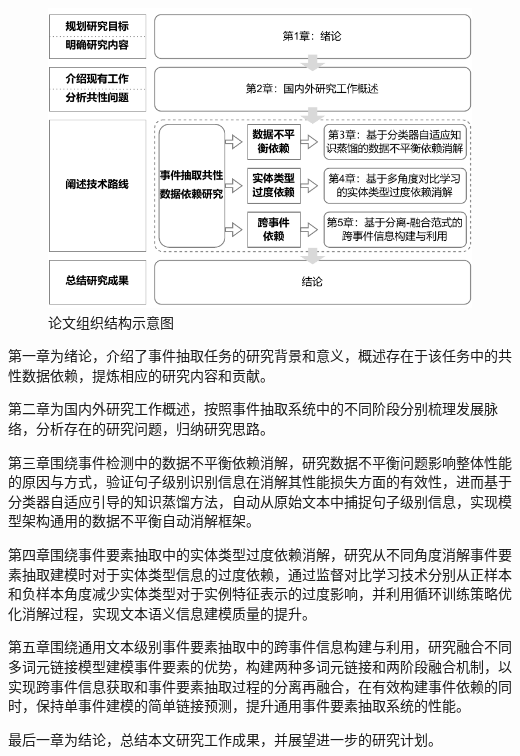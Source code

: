 \begin{figure}[]
    \centering
   \includegraphics[width=1\linewidth]{figures/chap1/organization.pdf}
   \caption{论文组织结构示意图}
   \label{organization}
\end{figure}

第一章为绪论，介绍了事件抽取任务的研究背景和意义，概述存在于该任务中的共性数据依赖，提炼相应的研究内容和贡献。

第二章为国内外研究工作概述，按照事件抽取系统中的不同阶段分别梳理发展脉络，分析存在的研究问题，归纳研究思路。

第三章围绕事件检测中的数据不平衡依赖消解，研究数据不平衡问题影响整体性能的原因与方式，验证句子级别识别信息在消解其性能损失方面的有效性，进而基于分类器自适应引导的知识蒸馏方法，自动从原始文本中捕捉句子级别信息，实现模型架构通用的数据不平衡自动消解框架。

第四章围绕事件要素抽取中的实体类型过度依赖消解，研究从不同角度消解事件要素抽取建模时对于实体类型信息的过度依赖，通过监督对比学习技术分别从正样本和负样本角度减少实体类型对于实例特征表示的过度影响，并利用循环训练策略优化消解过程，实现文本语义信息建模质量的提升。

第五章围绕通用文本级别事件要素抽取中的跨事件信息构建与利用，研究融合不同多词元链接模型建模事件要素的优势，构建两种多词元链接和两阶段融合机制，以实现跨事件信息获取和事件要素抽取过程的分离再融合，在有效构建事件依赖的同时，保持单事件建模的简单链接预测，提升通用事件要素抽取系统的性能。

最后一章为结论，总结本文研究工作成果，并展望进一步的研究计划。


